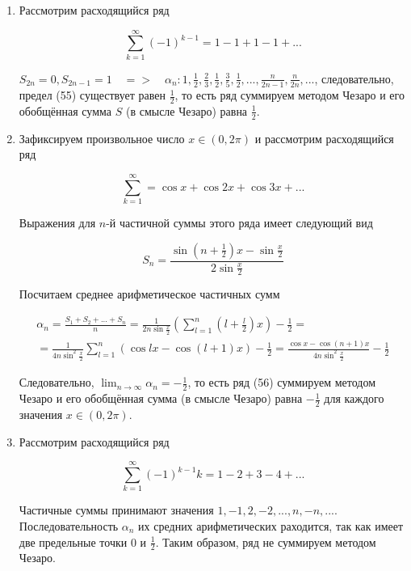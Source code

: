 \begin{enumerate}
	\item Рассмотрим расходящийся ряд
	
	\begin{equation*}
		\displaystyle\sum_{k = 1}^\infty (-1)^{k - 1} = 1 - 1 + 1 - 1 + ...
	\end{equation*}
	
	$S_{2n} = 0, S_{2n - 1} = 1\quad =>\quad \alpha_n \colon 1, \frac{1}{2}, \frac{2}{3}, \frac{1}{2}, \frac{3}{5}, \frac{1}{2}, ..., \frac{n}{2n - 1}, \frac{n}{2n}, ...$, следовательно, предел (55) существует равен $\frac{1}{2}$, то есть ряд суммируем методом Чезаро и его обобщённая сумма $S$ (в смысле Чезаро) равна $\frac{1}{2}$.
	
	\item Зафиксируем произвольное число $x \in (0, 2\pi)$ и рассмотрим расходящийся ряд
	
	\begin{equation}
		\displaystyle\sum_{k = 1}^\infty = \cos x + \cos 2x + \cos 3x + ...
	\end{equation}
	
	Выражения для $n$-й частичной суммы этого ряда имеет следующий вид
	
	\begin{equation*}
		S_n = \frac{\sin(n + \frac{1}{2})x - \sin\frac{x}{2}}{2\sin\frac{x}{2}}
	\end{equation*}
	
	Посчитаем среднее арифметическое частичных сумм
	
	\begin{equation*}
		\begin{gathered}
			\alpha_n = \frac{S_1 + S_2 + ... + S_n}{n} = \frac{1}{2n\sin\frac{x}{2}} \left( \displaystyle\sum_{l = 1}^n \left( l + \frac{l}{2} \right) x \right) - \frac{1}{2} = \\
			= \frac{1}{4n\sin^2\frac{x}{2}} \displaystyle\sum_{l = 1}^n (\cos lx - \cos (l + 1)x) - \frac{1}{2} = \frac{\cos x - \cos (n + 1)x}{4n\sin^2 \frac{x}{2}} - \frac{1}{2}
		\end{gathered}
	\end{equation*}
	
	Следовательно, $\lim_{n \rightarrow \infty} \alpha_n = -\frac{1}{2}$, то есть ряд (56) суммируем методом Чезаро и его обобщённая сумма (в смысле Чезаро) равна $-\frac{1}{2}$ для каждого значения $x \in (0, 2\pi)$.
	
	\item Рассмотрим расходящийся ряд
	
	\begin{equation}
		\displaystyle\sum_{k = 1}^\infty (-1)^{k - 1}k = 1 - 2 + 3 - 4 + ...
	\end{equation}
	
	Частичные суммы принимают значения $1, -1, 2, -2, ..., n, -n, ...$. Последовательность $\alpha_n$ их средних арифметических раходится, так как имеет две предельные точки $0$ и $\frac{1}{2}$. Таким образом, ряд не суммируем методом Чезаро.
\end{enumerate}